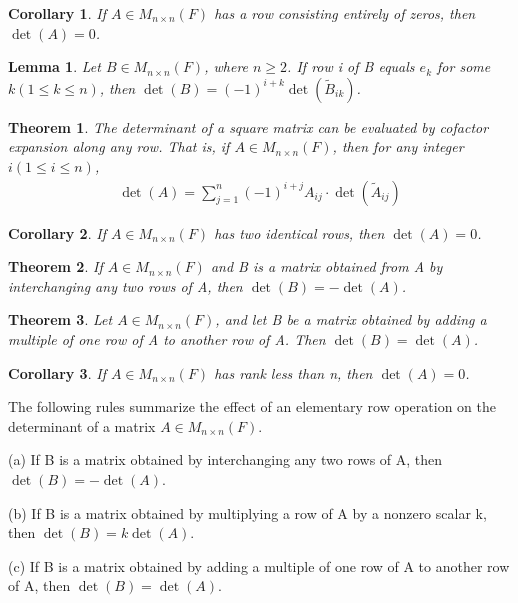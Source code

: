 \documentclass{article}
\theoremstyle{plain}
\newtheorem{theorem}{Theorem}[section]
\newtheorem*{lemma1}{Lemma}
\newtheorem*{corollary}{Corollary}
\theoremstyle{plain} %
\begin{document}
\begin{corollary}
  If $A \in M_{n\times n}(F)$ has a row consisting entirely of zeros, then $\det(A)=0$.
\end{corollary}

\begin{lemma1}
  Let $B \in M_{n\times n}(F)$, where $n \geq 2$. If row i of B equals $e_k$ for some $k (1 \leq  k \leq n)$, then $\det(B)=(−1)^{i+k} \det(\tilde{B}_{ik})$.
\end{lemma1}

\begin{theorem}
  The determinant of a square matrix can be evaluated by cofactor expansion along any row. That is, if $A \in M_{n\times n}(F)$, then for any integer $i (1 ≤ i ≤ n)$,
  \begin{align*}
    \det(A) = \sum_{j=1}^n {(-1)}^{i+j}A_{ij}\cdot \det(\tilde{A}_{ij})
  \end{align*}
\end{theorem}

\begin{corollary}
  If $A \in M_{n\times n}(F)$ has two identical rows, then $\det(A)=0$.
\end{corollary}

\begin{theorem}
  If $A \in M_{n\times n}(F)$ and B is a matrix obtained from A by interchanging any two rows of A, then $\det(B) = − \det(A)$.
\end{theorem}

\begin{theorem}
  Let $A \in M_{n\times n}(F)$, and let B be a matrix obtained by adding a multiple of one row of A to another row of A. Then $\det(B) = \det(A)$.
\end{theorem}

\begin{corollary}
  If $A \in M_{n\times n}(F)$ has rank less than n, then $\det(A)=0$.
\end{corollary}

The following rules summarize the effect of an elementary row operation on the determinant of a matrix $A \in M_{n\times n}(F)$.

(a) If B is a matrix obtained by interchanging any two rows of A, then $\det(B) = − \det(A)$.

(b) If B is a matrix obtained by multiplying a row of A by a nonzero scalar k, then $\det(B) = k \det(A)$.

(c) If B is a matrix obtained by adding a multiple of one row of A to another row of A, then $\det(B) = \det(A)$.
\end{document}
